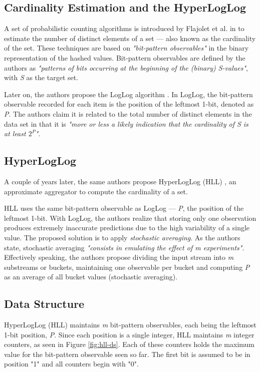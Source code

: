 \subsection{Cardinality Estimation and the HyperLogLog} \label{sec:hyper-log-log}

A set of probabilistic counting algorithms is introduced by Flajolet et al. in \cite{Flajolet-PCA} to estimate the number of distinct elements of a set --- also known as the cardinality of the set. These techniques are based on \textit{"bit-pattern observables"} in the binary representation of the hashed values. Bit-pattern observables are defined by the authors as \textit{"patterns of bits occurring at the beginning of the (binary) S-values"}, with \textit{S} as the target set.

Later on, the authors propose the LogLog algorithm \cite{Flajolet-LogLog}. In LogLog, the bit-pattern observable recorded for each item is the position of the leftmost 1-bit, denoted as \textit{P}. The authors claim it is related to the total number of distinct elements in the data set in that it is \textit{"more or less a likely indication that the cardinality of S is at least $2^P$"}.


\subsection*{HyperLogLog}
A couple of years later, the same authors propose HyperLogLog (HLL) \cite{Flajolet-HLL}, an approximate aggregator to compute the cardinality of a set. 

HLL uses the same bit-pattern observable as LogLog --- \textit{P}, the position of the leftmost 1-bit. With LogLog, the authors realize that storing only one observation produces extremely inaccurate predictions due to the high variability of a single value. The proposed solution is to apply \textit{stochastic averaging}. As the authors state, stochastic averaging \textit{"consists in emulating the effect of m experiments"}. Effectively speaking, the authors propose dividing the input stream into \textit{m} substreams or buckets, maintaining one observable per bucket and computing \textit{P} as an average of all bucket values (stochastic averaging).

\subsection*{Data Structure}
HyperLogLog (HLL) maintains \textit{m} bit-pattern observables, each being the leftmost 1-bit position, \textit{P}. Since each position is a single integer, HLL maintains \textit{m} integer counters, as seen in Figure \ref{fig:hll-ds}. Each of these counters holds the maximum value for the bit-pattern observable seen so far. The first bit is assumed to be in position "1" and all counters begin with "0".

